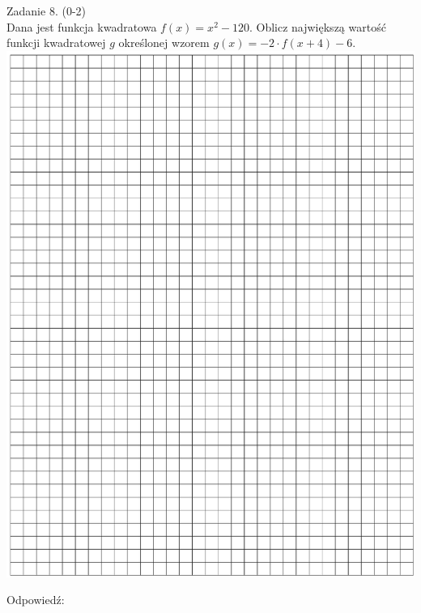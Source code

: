 \documentclass[10pt]{article}
\begin{document}
Zadanie 8. (0-2)\\
Dana jest funkcja kwadratowa \(f(x)=x^{2}-120\). Oblicz największą wartość funkcji kwadratowej \(g\) określonej wzorem \(g(x)=-2 \cdot f(x+4)-6\).\\
\includegraphics[max width=\textwidth, center]{2024_11_21_5229b9d0453456f1828dg-06}

Odpowiedź:
\end{document}
